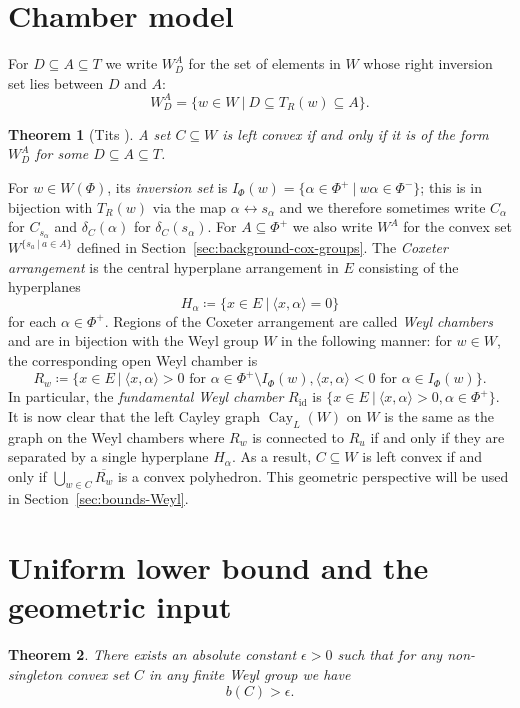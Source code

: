 \documentclass{amsart}
\DeclareMathOperator{\cay}{Cay}
\newcommand{\id}{\mathrm{id}}
\newtheorem{theorem}{Theorem}[section]
\theoremstyle{definition}
\theoremstyle{remark}
\begin{document}
\section*{Chamber model}
For $D \subseteq A \subseteq T$ we write $W_D^A$ for the set of elements in $W$ whose right inversion set lies between $D$ and $A$:
\[
W_D^A=\{w \in W \: | \: D \subseteq T_R(w) \subseteq A\}.
\]

\begin{theorem}[Tits \cite{Tits}]
\label{thm:tits-convexity}
A set $C \subseteq W$ is left convex if and only if it is of the form $W_D^A$ for some $D \subseteq A \subseteq T$.
\end{theorem}

For $w\in W(\Phi)$, its \emph{inversion set} is $I_{\Phi}(w)=\{\alpha\in\Phi^+\:|\: w\alpha\in\Phi^-\}$; this is in bijection with $T_R(w)$ via the map $\alpha \leftrightarrow s_{\alpha}$ and we therefore sometimes write $C_{\alpha}$ for $C_{s_{\alpha}}$ and $\delta_C(\alpha)$ for $\delta_C(s_{\alpha})$.  For $A \subseteq \Phi^+$ we also write $W^A$ for the convex set $W^{\{s_a \: | \: a \in A\}}$ defined in Section~\ref{sec:background-cox-groups}. The \emph{Coxeter arrangement} is the central hyperplane arrangement in $E$ consisting of the hyperplanes
\[
H_{\alpha}\coloneqq\{x\in E\:|\:\langle x,\alpha\rangle=0\}
\]
for each $\alpha\in\Phi^+$. Regions of the Coxeter arrangement are called \emph{Weyl chambers} and are in bijection with the Weyl group $W$ in the following manner: for $w\in W$, the corresponding open Weyl chamber is
\[
R_w\coloneqq\{x\in E\:|\: \langle x,\alpha\rangle>0\text{ for }\alpha\in\Phi^+\setminus I_{\Phi}(w),\langle x,\alpha\rangle<0\text{ for }\alpha\in I_{\Phi}(w)\}.
\]
In particular, the \emph{fundamental Weyl chamber} $R_{\id}$ is $\{x\in E\:|\:\langle x,\alpha\rangle>0,\alpha\in\Phi^+\}$. It is now clear that the left Cayley graph $\cay_L(W)$ on $W$ is the same as the graph on the Weyl chambers where $R_w$ is connected to $R_u$ if and only if they are separated by a single hyperplane $H_{\alpha}$. As a result, $C\subseteq W$ is left convex if and only if $\bigcup_{w\in C}\overline{R_w}$ is a convex polyhedron. This geometric perspective will be used in Section~\ref{sec:bounds-Weyl}.

\section*{Uniform lower bound and the geometric input}
\begin{theorem}\label{thm:uniform-bound}
There exists an absolute constant $\epsilon>0$ such that for any non-singleton convex set $C$ in any finite Weyl group we have
\[
b(C)>\epsilon.
\]
\end{theorem}
\end{document}
